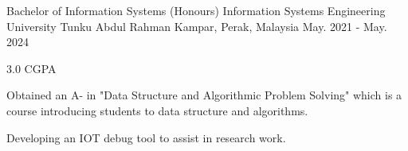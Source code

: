 

\begin{cventries}

  \cventry
    {Bachelor of Information Systems (Honours) Information Systems Engineering} %
    {University Tunku Abdul Rahman} %
    {Kampar, Perak, Malaysia} %
    {May. 2021 - May. 2024} %
    {
      \begin{cvitems} %
        \item {3.0 CGPA}
        \item {Obtained an A- in "Data Structure and Algorithmic Problem Solving" which is a course introducing students to data structure and algorithms.}
        \item {Developing an IOT debug tool to assist in research work.}
      \end{cvitems}
    }
\end{cventries}
